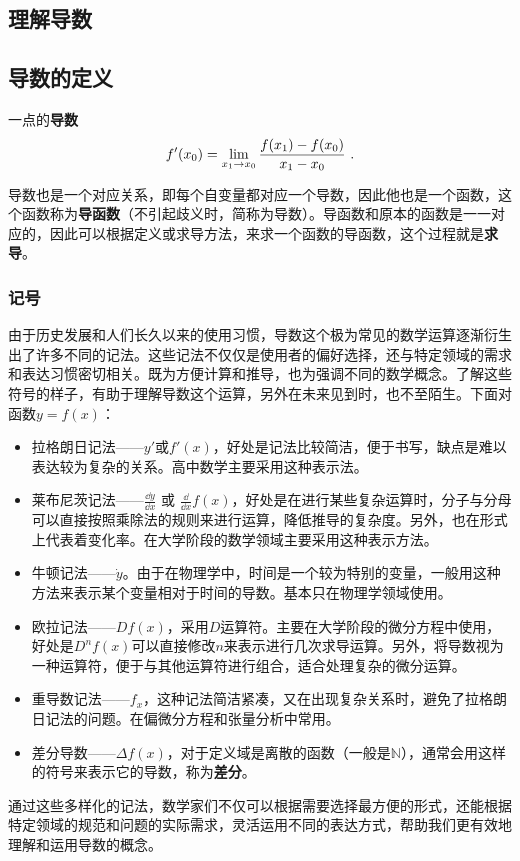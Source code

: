
\begin{issues}
\issueDraft
\end{issues}

\subsection{理解导数}

\subsection{导数的定义}
一点的\textbf{导数}
\begin{equation}
f'(x_0)=\lim_{x_1\to x_0}{f(x_1)-f(x_0)\over x_1-x_0}~.
\end{equation}

导数也是一个对应关系，即每个自变量都对应一个导数，因此他也是一个函数，这个函数称为\textbf{导函数}（不引起歧义时，简称为导数）。导函数和原本的函数是一一对应的，因此可以根据定义或求导方法，来求一个函数的导函数，这个过程就是\textbf{求导}。

\subsubsection{记号}
由于历史发展和人们长久以来的使用习惯，导数这个极为常见的数学运算逐渐衍生出了许多不同的记法。这些记法不仅仅是使用者的偏好选择，还与特定领域的需求和表达习惯密切相关。既为方便计算和推导，也为强调不同的数学概念。了解这些符号的样子，有助于理解导数这个运算，另外在未来见到时，也不至陌生。下面对函数$y=f(x)$：
\begin{itemize}
\item 拉格朗日记法——$y'$或$f'(x)$，好处是记法比较简洁，便于书写，缺点是难以表达较为复杂的关系。高中数学主要采用这种表示法。
\item 莱布尼茨记法——$\displaystyle\frac{\dd y}{\dd x}$  或  $\displaystyle\frac{\dd}{\dd x}f(x)$，好处是在进行某些复杂运算时，分子与分母可以直接按照乘除法的规则来进行运算，降低推导的复杂度。另外，也在形式上代表着变化率。在大学阶段的数学领域主要采用这种表示方法。
\item 牛顿记法——$\dot{y}$。由于在物理学中，时间是一个较为特别的变量，一般用这种方法来表示某个变量相对于时间的导数。基本只在物理学领域使用。
\item 欧拉记法——$Df(x)$，采用$D$运算符。主要在大学阶段的微分方程中使用，好处是$D^n f(x)$可以直接修改$n$来表示进行几次求导运算。另外，将导数视为一种运算符，便于与其他运算符进行组合，适合处理复杂的微分运算。
\item 重导数记法——$f_x$，这种记法简洁紧凑，又在出现复杂关系时，避免了拉格朗日记法的问题。在偏微分方程和张量分析中常用。
\item 差分导数——$\Delta f(x)$，对于定义域是离散的函数（一般是$\mathbb{N}$），通常会用这样的符号来表示它的导数，称为\textbf{差分}。
\end{itemize}
通过这些多样化的记法，数学家们不仅可以根据需要选择最方便的形式，还能根据特定领域的规范和问题的实际需求，灵活运用不同的表达方式，帮助我们更有效地理解和运用导数的概念。
